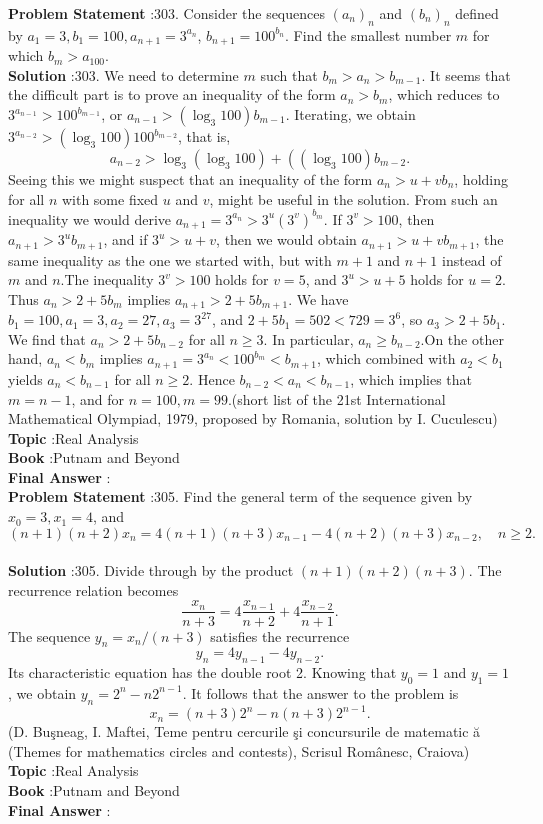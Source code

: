 \documentclass[10pt]{article}
\begin{document}
\textbf{Problem Statement} :303. Consider the sequences $\left(a_{n}\right)_{n}$ and $\left(b_{n}\right)_{n}$ defined by $a_{1}=3, b_{1}=100, a_{n+1}=3^{a_{n}}$, $b_{n+1}=100^{b_{n}}$. Find the smallest number $m$ for which $b_{m}>a_{100}$. \\
\textbf{Solution} :303. We need to determine $m$ such that $b_{m}>a_{n}>b_{m-1}$. It seems that the difficult part is to prove an inequality of the form $a_{n}>b_{m}$, which reduces to $3^{a_{n-1}}>100^{b_{m-1}}$, or $a_{n-1}>\left(\log _{3} 100\right) b_{m-1}$. Iterating, we obtain $3^{a_{n-2}}>\left(\log _{3} 100\right) 100^{b_{m-2}}$, that is,$$ a_{n-2}>\log _{3}\left(\log _{3} 100\right)+\left(\left(\log _{3} 100\right) b_{m-2} .\right. $$Seeing this we might suspect that an inequality of the form $a_{n}>u+v b_{n}$, holding for all $n$ with some fixed $u$ and $v$, might be useful in the solution. From such an inequality we would derive $a_{n+1}=3^{a_{n}}>3^{u}\left(3^{v}\right)^{b_{m}}$. If $3^{v}>100$, then $a_{n+1}>3^{u} b_{m+1}$, and if $3^{u}>u+v$, then we would obtain $a_{n+1}>u+v b_{m+1}$, the same inequality as the one we started with, but with $m+1$ and $n+1$ instead of $m$ and $n$.The inequality $3^{v}>100$ holds for $v=5$, and $3^{u}>u+5$ holds for $u=2$. Thus $a_{n}>2+5 b_{m}$ implies $a_{n+1}>2+5 b_{m+1}$. We have $b_{1}=100, a_{1}=3, a_{2}=27, a_{3}=3^{27}$, and $2+5 b_{1}=502<729=3^{6}$, so $a_{3}>2+5 b_{1}$. We find that $a_{n}>2+5 b_{n-2}$ for all $n \geq 3$. In particular, $a_{n} \geq b_{n-2}$.On the other hand, $a_{n}<b_{m}$ implies $a_{n+1}=3^{a_{n}}<100^{b_{m}}<b_{m+1}$, which combined with $a_{2}<b_{1}$ yields $a_{n}<b_{n-1}$ for all $n \geq 2$. Hence $b_{n-2}<a_{n}<b_{n-1}$, which implies that $m=n-1$, and for $n=100, m=99$.(short list of the 21st International Mathematical Olympiad, 1979, proposed by Romania, solution by I. Cuculescu) \\
\textbf{Topic} :Real Analysis\\
\textbf{Book} :Putnam and Beyond\\
\textbf{Final Answer} :\\


\textbf{Problem Statement} :305. Find the general term of the sequence given by $x_{0}=3, x_{1}=4$, and$$ (n+1)(n+2) x_{n}=4(n+1)(n+3) x_{n-1}-4(n+2)(n+3) x_{n-2}, \quad n \geq 2 . $$\\
\textbf{Solution} :305. Divide through by the product $(n+1)(n+2)(n+3)$. The recurrence relation becomes$$ \frac{x_{n}}{n+3}=4 \frac{x_{n-1}}{n+2}+4 \frac{x_{n-2}}{n+1} . $$The sequence $y_{n}=x_{n} /(n+3)$ satisfies the recurrence$$ y_{n}=4 y_{n-1}-4 y_{n-2} . $$Its characteristic equation has the double root 2. Knowing that $y_{0}=1$ and $y_{1}=1$, we obtain $y_{n}=2^{n}-n 2^{n-1}$. It follows that the answer to the problem is$$ x_{n}=(n+3) 2^{n}-n(n+3) 2^{n-1} . $$(D. Buşneag, I. Maftei, Teme pentru cercurile şi concursurile de matematic ă (Themes for mathematics circles and contests), Scrisul Românesc, Craiova)\\
\textbf{Topic} :Real Analysis\\
\textbf{Book} :Putnam and Beyond\\
\textbf{Final Answer} :\\
\end{document}
